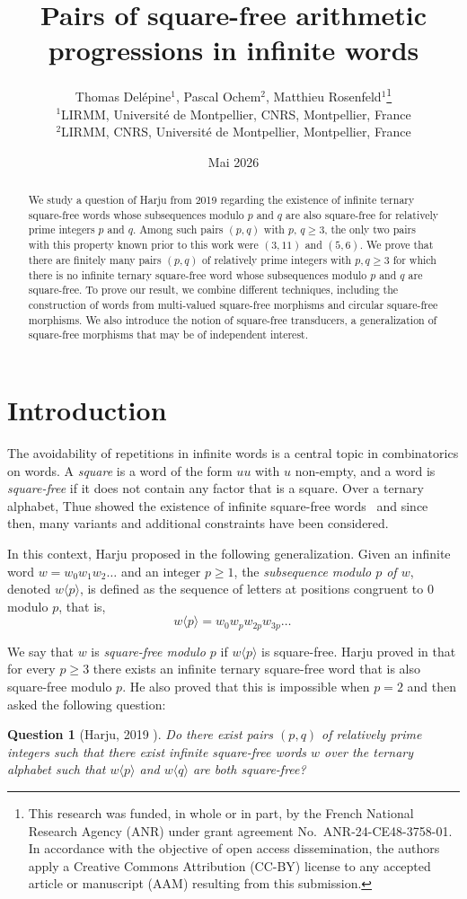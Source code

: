 \documentclass[12pt]{article}
\title{Pairs of square-free arithmetic progressions in infinite words}
\author{Thomas Delépine$^{1}$, Pascal Ochem$^{2}$, Matthieu Rosenfeld$^{1}$\thanks{This research was funded, in whole or in part, by the French National Research Agency (ANR) under grant agreement No.~ANR-24-CE48-3758-01. In accordance with the objective of open access dissemination, the authors apply a Creative Commons Attribution (CC-BY) license to any accepted article or manuscript (AAM) resulting from this submission.}\\[0.5em]
\small $^{1}$LIRMM, Université de Montpellier, CNRS, Montpellier, France\\
\small $^{2}$LIRMM, CNRS, Université de Montpellier, Montpellier, France}
\date{Mai 2026}
\newtheorem{question}[theorem]{Question}
\theoremstyle{definition}
\newcommand{\subsequence}[2]{#1\langle#2\rangle}
\begin{document}
\maketitle

\begin{abstract}

We study a question of Harju from 2019 regarding the existence of infinite ternary square-free words whose subsequences modulo $p$ and $q$ are also square-free for relatively prime integers $p$ and $q$. Among such pairs $(p, q)$ with $p$, $q \ge 3$, the only two pairs with this property known prior to this work were $(3, 11)$ and $(5, 6)$. We prove that there are finitely many pairs $(p, q)$ of relatively prime integers with $p, q \ge 3$ for which there is no infinite ternary square-free word whose subsequences modulo $p$ and $q$ are square-free. To prove our result, we combine different techniques, including the construction of words from multi-valued square-free morphisms and circular square-free morphisms. We also introduce the notion of square-free transducers, a generalization of square-free morphisms that may be of independent interest.
    
\end{abstract}

\section{Introduction}\label{chap:intro}
The avoidability of repetitions in infinite words is a central topic in combinatorics on words. A \emph{square} is a word of the form $uu$ with $u$ non-empty, and a word is \emph{square-free} if it does not contain any factor that is a square. Over a ternary alphabet, Thue showed the existence of infinite square-free words~\cite{thue1906uber} and since then, many variants and additional constraints have been considered.

In this context, Harju proposed in \cite{HARJU201995} the following generalization. Given an infinite word $w=w_0w_1w_2\ldots$ and an integer $p \geq 1$, the \emph{subsequence modulo $p$ of $w$}, denoted $\subsequence{w}{p}$, is defined as the sequence of letters at positions congruent to $0$ modulo $p$, that is,
\[
\subsequence{w}{p}=w_0w_pw_{2p}w_{3p}\ldots\,
\] 

We say that $w$ is \emph{square-free modulo $p$} if $\subsequence{w}{p}$ is square-free. Harju proved in \cite{HARJU201995} that for every $p\ge3$ there exists an infinite ternary square-free word that is also square-free modulo $p$. He also proved that this is impossible when $p=2$ and then asked the following question:
\begin{question}[Harju, 2019 \cite{HARJU201995}]\label{question:harju}
Do there exist pairs $(p,q)$ of relatively prime integers such that there exist infinite square-free words $w$ over the ternary alphabet such that $\subsequence{w}{p}$ and $\subsequence{w}{q}$ are both square-free?
\end{question}
\end{document}
